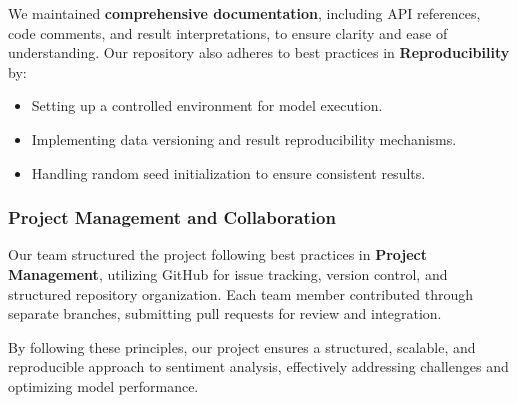We maintained \textbf{comprehensive documentation}, including API references, code comments, and result interpretations, to ensure clarity and ease of understanding. Our repository also adheres to best practices in \textbf{Reproducibility} by:
\begin{itemize}
    \item Setting up a controlled environment for model execution.
    \item Implementing data versioning and result reproducibility mechanisms.
    \item Handling random seed initialization to ensure consistent results.
\end{itemize}

\subsubsection{Project Management and Collaboration}

Our team structured the project following best practices in \textbf{Project Management}, utilizing GitHub for issue tracking, version control, and structured repository organization. Each team member contributed through separate branches, submitting pull requests for review and integration. 

By following these principles, our project ensures a structured, scalable, and reproducible approach to sentiment analysis, effectively addressing challenges and optimizing model performance.


\newpage